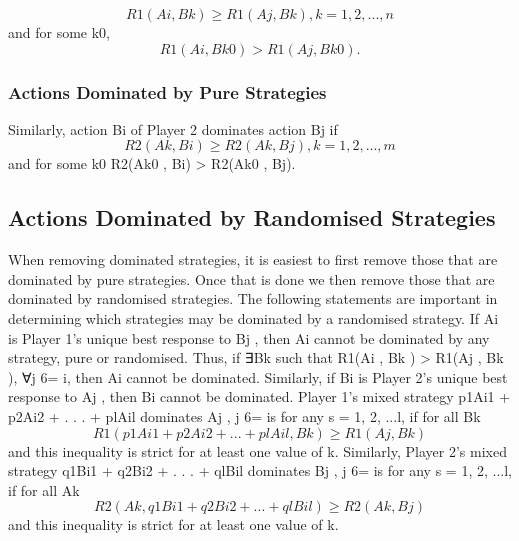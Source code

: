 \documentclass[]{report}
\begin{document}
\[	R1(Ai
	, Bk ) \geq R1(Aj
	, Bk ), k = 1, 2, . . . , n\]
	and for some k0, \[R1(Ai
	, Bk0
	) > R1(Aj
	, Bk0
	).\]
	\subsubsection{Actions Dominated by Pure Strategies}
	Similarly, action Bi of Player 2 dominates action Bj
	if
\[	R2(Ak , Bi) \geq R2(Ak , Bj), k = 1, 2, . . . , m\]
	and for some k0
	R2(Ak0
	, Bi) > R2(Ak0
	, Bj).
	\subsection{Actions Dominated by Randomised Strategies}
	When removing dominated strategies, it is easiest to first remove
	those that are dominated by pure strategies.
	Once that is done we then remove those that are dominated by
	randomised strategies.
	The following statements are important in determining which
	strategies may be dominated by a randomised strategy.
	If Ai
	is Player 1’s unique best response to Bj
	, then Ai cannot be
	dominated by any strategy, pure or randomised.
	Thus, if ∃Bk such that R1(Ai
	, Bk ) > R1(Aj
	, Bk ), ∀j 6= i, then Ai
	cannot be dominated.
	Similarly, if Bi
	is Player 2’s unique best response to Aj
	, then Bi
	cannot be dominated.
	Player 1’s mixed strategy p1Ai1 + p2Ai2 + . . . + plAil
	dominates Aj
	,
	j 6= is for any s = 1, 2, ...l, if for all Bk
	\[R1(p1Ai1 + p2Ai2 + . . . + plAil
	, Bk ) \geq R1(Aj
	, Bk )\]
	and this inequality is strict for at least one value of k.
	Similarly, Player 2’s mixed strategy q1Bi1 + q2Bi2 + . . . + qlBil
	dominates Bj
	, j 6= is for any s = 1, 2, ...l, if for all Ak
	\[R2(Ak , q1Bi1 + q2Bi2 + . . . + qlBil
	) \geq R2(Ak , Bj)\]
	and this inequality is strict for at least one value of k.
\end{document}
